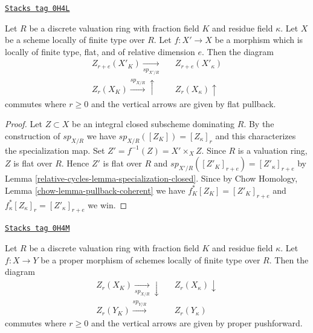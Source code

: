 \begin{lemma}
\label{relative-cycles-lemma-specialization-flat-pullback}
\href{https://stacks.math.columbia.edu/tag/0H4L}{\texttt{Stacks tag 0H4L}}

Let $R$ be a discrete valuation ring with fraction field $K$ and residue field
$\kappa$. Let $X$ be a scheme locally of finite type over $R$.
Let $f : X' \to X$ be a morphism which is locally of finite type, flat,
and of relative dimension $e$. Then the diagram
$$
\begin{array}{ccc}Z_{r + e}(X'_K) \underset{sp_{X'/R}}{\longrightarrow} &  & Z_{r + e}(X'_\kappa) \\ Z_r(X_K) \overset{sp_{X/R}}{\longrightarrow}\uparrow &  & Z_r(X_\kappa) \uparrow\end{array}
$$
commutes where $r \geq 0$ and the vertical arrows are given
by flat pullback.
\end{lemma}

\begin{proof}
Let $Z \subset X$ be an integral closed subscheme dominating $R$.
By the construction of $sp_{X/R}$ we have $sp_{X/R}([Z_K]) = [Z_\kappa]_r$
and this characterizes the specialization map.
Set $Z' = f^{-1}(Z) = X' \times_X Z$.
Since $R$ is a valuation ring, $Z$ is flat over $R$.
Hence $Z'$ is flat over $R$ and
$sp_{X'/R}([Z'_K]_{r + e}) = [Z'_\kappa]_{r + e}$
by Lemma \ref{relative-cycles-lemma-specialization-closed}.
Since by Chow Homology, Lemma \ref{chow-lemma-pullback-coherent}
we have $f_K^*[Z_K] = [Z'_K]_{r + e}$ and
$f_\kappa^*[Z_\kappa]_r = [Z'_\kappa]_{r + e}$ we win.
\end{proof}

\begin{lemma}
\label{relative-cycles-lemma-specialization-proper-pushforward}
\href{https://stacks.math.columbia.edu/tag/0H4M}{\texttt{Stacks tag 0H4M}}

Let $R$ be a discrete valuation ring with fraction field $K$ and residue field
$\kappa$. Let $f : X \to Y$ be a proper morphism of schemes locally of
finite type over $R$. Then the diagram
$$
\begin{array}{ccc}Z_r(X_K) \underset{sp_{X/R}}{\longrightarrow}\downarrow &  & Z_r(X_\kappa) \downarrow \\ Z_r(Y_K) \overset{sp_{Y/R}}{\longrightarrow} &  & Z_r(Y_\kappa)\end{array}
$$
commutes where $r \geq 0$ and the vertical arrows are given
by proper pushforward.
\end{lemma}

